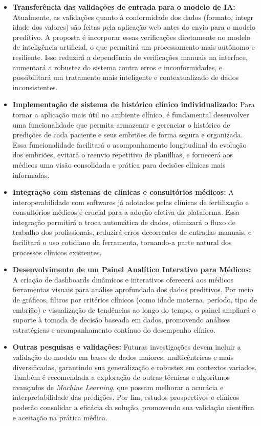\begin{itemize}
    \item \textbf{Transferência das validações de entrada para o modelo de IA:}  
    Atualmente, as validações quanto à conformidade dos dados (formato, integr                        idade dos valores) são feitas pela aplicação web antes do envio para o modelo preditivo. A proposta é incorporar essas verificações diretamente no modelo de inteligência artificial, o que permitirá um processamento mais autônomo e resiliente. Isso reduzirá a dependência de verificações manuais na interface, aumentará a robustez do sistema contra erros e inconformidades, e possibilitará um tratamento mais inteligente e contextualizado de dados inconsistentes.

    \item \textbf{Implementação de sistema de histórico clínico individualizado:}  
    Para tornar a aplicação mais útil no ambiente clínico, é fundamental desenvolver uma funcionalidade que permita armazenar e gerenciar o histórico de predições de cada paciente e seus embriões de forma segura e organizada. Essa funcionalidade facilitará o acompanhamento longitudinal da evolução dos embriões, evitará o reenvio repetitivo de planilhas, e fornecerá aos médicos uma visão consolidada e prática para decisões clínicas mais informadas.

    \item \textbf{Integração com sistemas de clínicas e consultórios médicos:}  
    A interoperabilidade com softwares já adotados pelas clínicas de fertilização e consultórios médicos é crucial para a adoção efetiva da plataforma. Essa integração permitirá a troca automática de dados, otimizará o fluxo de trabalho dos profissionais, reduzirá erros decorrentes de entradas manuais, e facilitará o uso cotidiano da ferramenta, tornando-a parte natural dos processos clínicos existentes.

    \item \textbf{Desenvolvimento de um Painel Analítico Interativo para Médicos:}  
    A criação de dashboards dinâmicos e interativos oferecerá aos médicos ferramentas visuais para análise aprofundada dos dados preditivos. Por meio de gráficos, filtros por critérios clínicos (como idade materna, período, tipo de embrião) e visualização de tendências ao longo do tempo, o painel ampliará o suporte à tomada de decisão baseada em dados, promovendo análises estratégicas e acompanhamento contínuo do desempenho clínico.

    \item \textbf{Outras pesquisas e validações:}  
    Futuras investigações devem incluir a validação do modelo em bases de dados maiores, multicêntricas e mais diversificadas, garantindo sua generalização e robustez em contextos variados. Também é recomendada a exploração de outras técnicas e algoritmos avançados de \textit{Machine Learning}, que possam melhorar a acurácia e interpretabilidade das predições. Por fim, estudos prospectivos e clínicos poderão consolidar a eficácia da solução, promovendo sua validação científica e aceitação na prática médica.

\end{itemize}

